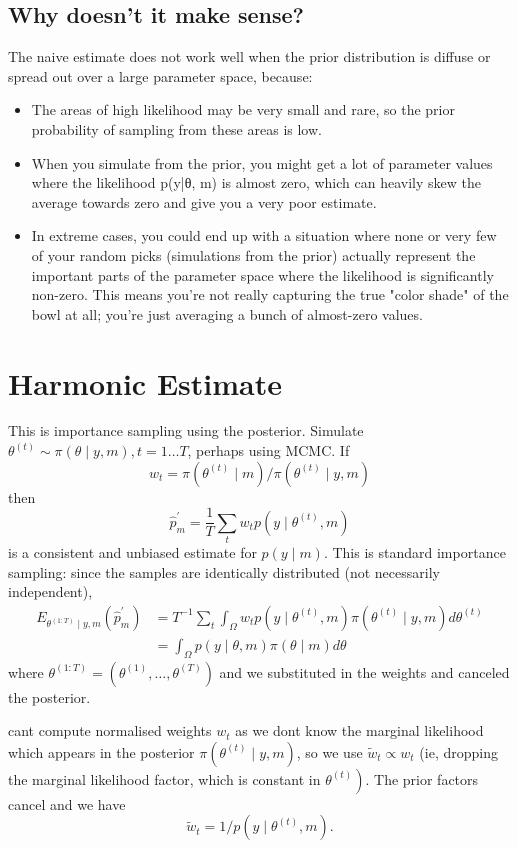 \documentclass{article}
\begin{document}
\subsection{Why doesn't it make sense?}
The naive estimate does not work well when the prior distribution is diffuse or spread out over a large parameter space, because:
\begin{itemize}
    \item The areas of high likelihood may be very small and rare, so the prior probability of sampling from these areas is low.
    \item When you simulate from the prior, you might get a lot of parameter values where the likelihood p(y|θ, m) is almost zero, which can heavily skew the average towards zero and give you a very poor estimate.
    \item In extreme cases, you could end up with a situation where none or very few of your random picks (simulations from the prior) actually represent the important parts of the parameter space where the likelihood is significantly non-zero. This means you're not really capturing the true "color shade" of the bowl at all; you're just averaging a bunch of almost-zero values.
\end{itemize}

\section{Harmonic Estimate}
This is importance sampling using the posterior.
Simulate $\theta^{(t)} \sim \pi(\theta \mid y, m), t=1 \ldots T$, perhaps using MCMC. If
$$
w_t=\pi\left(\theta^{(t)} \mid m\right) / \pi\left(\theta^{(t)} \mid y, m\right)
$$
then
$$
\hat{p}_m^{\prime}=\frac{1}{T} \sum_t w_t p\left(y \mid \theta^{(t)}, m\right)
$$
is a consistent and unbiased estimate for $p(y \mid m)$. This is standard importance sampling: since the samples are identically distributed (not necessarily independent),
$$
\begin{aligned}
E_{\theta^{(1: T)} \mid y, m}\left(\hat{p}_m^{\prime}\right) & =T^{-1} \sum_t \int_{\Omega} w_t p\left(y \mid \theta^{(t)}, m\right) \pi\left(\theta^{(t)} \mid y, m\right) d \theta^{(t)} \\
& =\int_{\Omega} p(y \mid \theta, m) \pi(\theta \mid m) d \theta
\end{aligned}
$$
where $\theta^{(1: T)}=\left(\theta^{(1)}, \ldots, \theta^{(T)}\right)$ and we substituted in the weights and canceled the posterior. 

cant compute normalised weights $w_t$ as we dont know the marginal likelihood which appears in the posterior $\pi\left(\theta^{(t)} \mid y, m\right)$, so we use $\tilde{w}_t \propto w_t$ (ie, dropping the marginal likelihood factor, which is constant in $\left.\theta^{(t)}\right)$. The prior factors cancel and we have
$$
\tilde{w}_t=1 / p\left(y \mid \theta^{(t)}, m\right) .
$$
\end{document}
